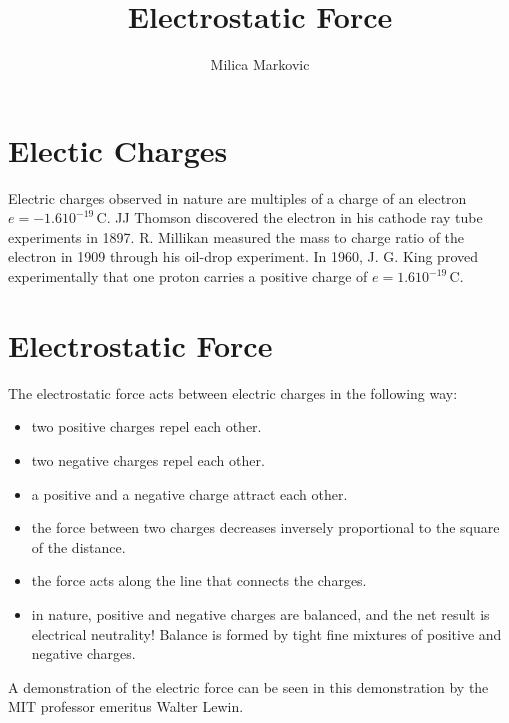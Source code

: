 \documentclass{ximera}
\title{Electrostatic Force}
\author{Milica Markovic}
\begin{document}
  
\begin{abstract}  

\end{abstract}  
\maketitle    



\section{Electic Charges}
 Electric charges observed in nature are multiples of a charge of an electron $e=-1.6 10^{-19}$\,C. JJ Thomson discovered the electron in his cathode ray tube experiments in  1897. R. Millikan measured the mass to charge ratio of the electron in 1909 through his oil-drop experiment.  In 1960, J. G. King proved experimentally that one proton carries a positive charge of $e=1.6 10^{-19}$\,C. 



\section{Electrostatic Force}

The electrostatic force acts between electric charges in the following way:

\begin{itemize}
\item two positive charges repel each other.
\item two negative charges repel each other.
\item a positive and a negative charge attract each other.
\item the force between two charges decreases inversely proportional to the square of the distance.
\item the force acts along the line that connects the charges.
\item in nature, positive and negative charges are balanced, and the net result is electrical neutrality! Balance is formed by tight fine mixtures of positive and negative charges.
\end{itemize}
 
 A demonstration of the electric force can be seen in this demonstration by 
 the MIT professor emeritus Walter Lewin.
 
 \begin{center}
 \end{center}
 
\end{document}
